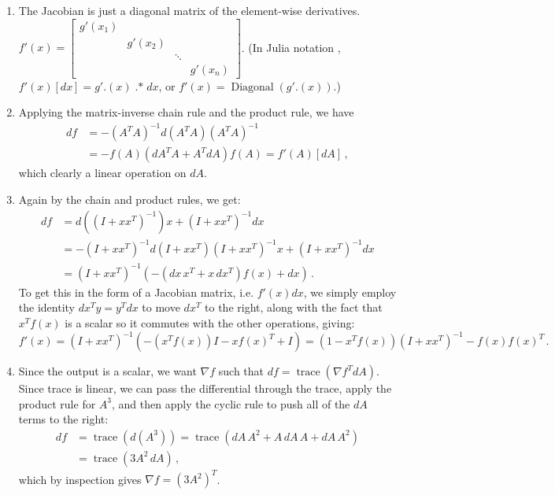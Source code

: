 \documentclass[10pt,oneside]{article}
\newcommand{\tr}{\operatorname{trace}}
\newcommand{\dotstar}{\operatorname{.*}}
\begin{document}
\begin{enumerate}

\item The Jacobian is just a diagonal matrix of the element-wise derivatives. $\boxed{f'(x) = \begin{bmatrix} g'(x_1) & & & \\ & g'(x_2) & & \\ & & \ddots & \\ & & & g'(x_n) \end{bmatrix}}$.  (In Julia notation , $f'(x)[dx] = g'.(x) \dotstar dx$, or $f'(x) = \operatorname{Diagonal}(g'.(x))$.)

\item Applying the matrix-inverse chain rule and the product rule, we have
\begin{align*}
    df &= -(A^T A)^{-1} d(A^T A) (A^T A)^{-1} \\
    &= \boxed{-f(A) (dA^T A + A^T dA) f(A) = f'(A)[dA]} \, ,
\end{align*}
which clearly a linear operation on $dA$.

\item Again by the chain and product rules, we get:
\begin{align*}
df &= d((I+xx^T)^{-1}) x + (I+xx^T)^{-1} dx \\
&= -(I+xx^T)^{-1} d(I+xx^T) (I+xx^T)^{-1} x + (I+xx^T)^{-1} dx \\
&= (I+xx^T)^{-1} \left(-(dx\, x^T + x\, dx^T) f(x)  + dx\right)  \, .
\end{align*}
To get this in the form of a Jacobian matrix, i.e. $f'(x) dx$, we simply employ the identity $dx^T y = y^T dx$ to move $dx^T$ to the right, along with the fact that $x^T f(x)$ is a scalar so it commutes with the other operations, giving:
$$
\boxed{f'(x) = (I+xx^T)^{-1} \left( - (x^T f(x)) I  - x f(x)^T + I \right) = (1 - x^T f(x)) (I+xx^T)^{-1} - f(x) f(x)^T} \, .
$$

\item Since the output is a scalar, we want $\nabla f$ such that $df = \tr(\nabla f^T dA)$.  Since trace is linear, we can pass the differential through the trace, apply the product rule for $A^3$, and then apply the cyclic rule to push all of the $dA$ terms to the right:
\begin{align*}
df &= \tr(d(A^3)) = \tr(dA\,A^2 + A\, dA \, A + dA \, A^2) \\
&= \tr(3A^2 \, dA) \, ,
\end{align*}
which by inspection gives $\boxed{\nabla f = (3A^2)^T}$.

\end{enumerate}
\end{document}
